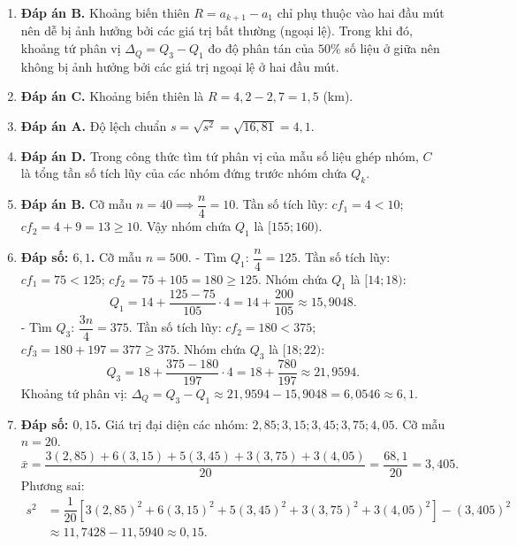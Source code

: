 \documentclass[12pt,a4paper]{article}
\begin{document}
\begin{enumerate}
\item \textbf{Đáp án B.}  
Khoảng biến thiên $R = a_{k+1} - a_1$ chỉ phụ thuộc vào hai đầu mút nên dễ bị ảnh hưởng bởi các giá trị bất thường (ngoại lệ). Trong khi đó, khoảng tứ phân vị $\Delta_Q = Q_3 - Q_1$ đo độ phân tán của $50\%$ số liệu ở giữa nên không bị ảnh hưởng bởi các giá trị ngoại lệ ở hai đầu mút.

\item \textbf{Đáp án C.}  
Khoảng biến thiên là $R = 4{,}2 - 2{,}7 = 1{,}5$ (km).

\item \textbf{Đáp án A.}  
Độ lệch chuẩn $s = \sqrt{s^2} = \sqrt{16{,}81} = 4{,}1$.

\item \textbf{Đáp án D.}  
Trong công thức tìm tứ phân vị của mẫu số liệu ghép nhóm, $C$ là tổng tần số tích lũy của các nhóm đứng trước nhóm chứa $Q_k$.

\item \textbf{Đáp án B.}  
Cỡ mẫu $n = 40 \implies \dfrac{n}{4} = 10$.  
Tần số tích lũy: $cf_1 = 4 < 10$; $cf_2 = 4 + 9 = 13 \ge 10$.  
Vậy nhóm chứa $Q_1$ là $[155; 160)$.

\item \textbf{Đáp số: $6{,}1$.}  
Cỡ mẫu $n = 500$.  
- Tìm $Q_1$: $\dfrac{n}{4} = 125$. Tần số tích lũy: $cf_1 = 75 < 125$; $cf_2 = 75 + 105 = 180 \ge 125$.  
Nhóm chứa $Q_1$ là $[14; 18)$:  
\[
Q_1 = 14 + \dfrac{125 - 75}{105} \cdot 4 = 14 + \dfrac{200}{105} \approx 15{,}9048.
\]
- Tìm $Q_3$: $\dfrac{3n}{4} = 375$. Tần số tích lũy: $cf_2 = 180 < 375$; $cf_3 = 180 + 197 = 377 \ge 375$.  
Nhóm chứa $Q_3$ là $[18; 22)$:  
\[
Q_3 = 18 + \dfrac{375 - 180}{197} \cdot 4 = 18 + \dfrac{780}{197} \approx 21{,}9594.
\]
Khoảng tứ phân vị: $\Delta_Q = Q_3 - Q_1 \approx 21{,}9594 - 15{,}9048 = 6{,}0546 \approx 6{,}1$.

\item \textbf{Đáp số: $0{,}15$.}  
Giá trị đại diện các nhóm: $2{,}85; 3{,}15; 3{,}45; 3{,}75; 4{,}05$. Cỡ mẫu $n = 20$.  
\[
\bar{x} = \dfrac{3(2{,}85) + 6(3{,}15) + 5(3{,}45) + 3(3{,}75) + 3(4{,}05)}{20} = \dfrac{68{,}1}{20} = 3{,}405.
\]
Phương sai:  
\begin{align*}
s^2 &= \dfrac{1}{20}\left[3(2{,}85)^2 + 6(3{,}15)^2 + 5(3{,}45)^2 + 3(3{,}75)^2 + 3(4{,}05)^2\right] - (3{,}405)^2 \\
    &\approx 11{,}7428 - 11{,}5940 \approx 0{,}15.
\end{align*}


\end{enumerate}
\end{document}
